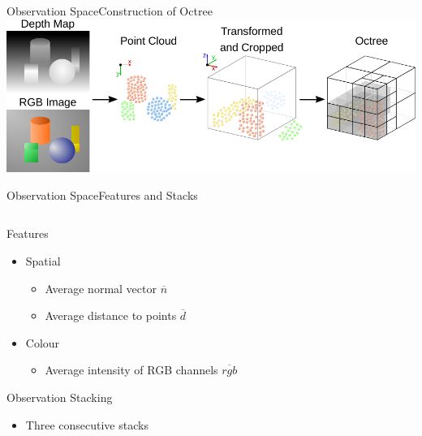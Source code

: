 \begin{frame}{Observation Space}{Construction of Octree}
    \centering
    \includegraphics[width=\textwidth]{graphics/octree_creation_sketch.pdf}
\end{frame}

\begin{frame}{Observation Space}{Features and Stacks}
    \begin{columns}%
        \begin{column}{0.5\textwidth}%
            \begin{block}{Features}
                \begin{itemize}
                    \item Spatial
                          \begin{itemize}
                              \item Average normal vector \(\overline{n}\)
                              \item Average distance to points \(\overline{d}\)
                          \end{itemize}
                    \item Colour
                          \begin{itemize}
                              \item Average intensity of RGB channels \(\overline{rgb}\)
                          \end{itemize}
                \end{itemize}
            \end{block}
            \begin{block}{Observation Stacking}
                \begin{itemize}
                    \item Three consecutive stacks
                \end{itemize}
            \end{block}
        \end{column}
        \begin{column}{0.5\textwidth}%

\end{column}
\end{columns}
\end{frame}
